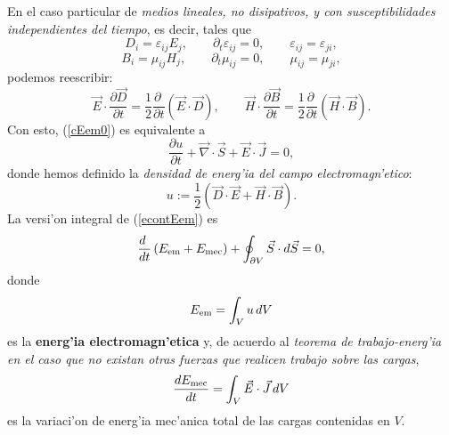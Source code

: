 En el caso particular de \textit{medios lineales, no disipativos, y con susceptibilidades
independientes del tiempo}, es decir, tales que
\begin{equation}
D_i=\varepsilon_{ij}E_j, \qquad \partial_t\varepsilon_{ij}=0, \qquad \varepsilon_{ij}=\varepsilon_{ji},
\end{equation}
\begin{equation}
B_i=\mu_{ij}H_j, \qquad \partial_t\mu_{ij}=0, \qquad \mu_{ij}=\mu_{ji},
\end{equation}
podemos reescribir:
\begin{equation}
 \vec{E}\cdot\frac{\partial \vec{D}}{\partial
t}=\frac{1}{2}\frac{\partial\ }{\partial t}\left(\vec{E}\cdot\vec{D}\right),
\qquad
 \vec{H}\cdot\frac{\partial \vec{B}}{\partial
t}=\frac{1}{2}\frac{\partial\ }{\partial t}\left(\vec{H}\cdot\vec{B}\right).
\end{equation}
Con esto, (\ref{cEem0}) es equivalente a
\begin{equation}
\boxed{\frac{\partial u}{\partial
t}+\vec\nabla\cdot\vec{S}+\vec{E}\cdot\vec{J}=0 ,} \label{econtEem}
\end{equation}
donde hemos definido la \textit{densidad de energ'ia del campo
electromagn'etico}:
\begin{equation}\label{uDEHB}
\boxed{u:=\frac{1}{2}\left(\vec{D}\cdot\vec{E}+\vec{H}\cdot\vec{B}\right).}
\end{equation}
La versi'on integral de (\ref{econtEem}) es
\begin{equation}
\frac{d\ }{dt}\left(E_{\rm em}+E_{\rm mec}\right)+\oint_{\partial
V}\vec{S}\cdot d\vec{S}=0 ,
\end{equation}
donde
\begin{equation}
E_{\rm em}=\int_V u\,dV
\end{equation}
es la \textbf{energ'ia electromagn'etica} y, de acuerdo al \textit{teorema de trabajo-energ'ia} \textit{en el caso que no existan otras fuerzas que realicen trabajo sobre las cargas},
\begin{equation}
 \frac{dE_{\rm mec}}{dt}=\int_V\vec{E}\cdot\vec{J}\,dV
\end{equation}
es la variaci'on de energ'ia mec'anica total de las cargas contenidas en $V$.


